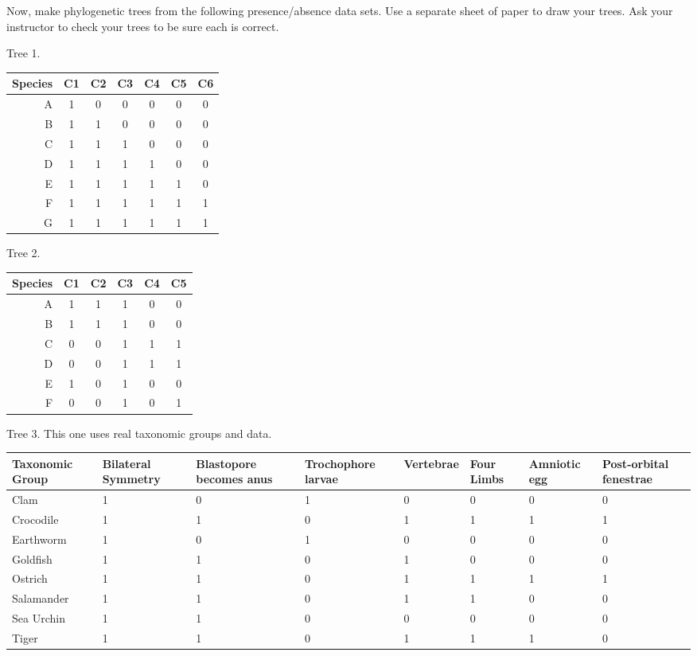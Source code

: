 \documentclass[12pt, addpoints]{exam}
\begin{document}
{\newpage

\thispagestyle{empty}

\begin{landscape}

Now, make phylogenetic trees from the following presence/absence data sets. Use a separate sheet of paper to draw your trees. Ask your instructor to check your trees to be sure each is correct. %

\begin{questions}

\liningnum

\begin{minipage}[t]{0.4\textwidth}
\question
Tree 1.

\begin{longtable}[l]{@{}rcccccc@{}}
\toprule
Species & C1 & C2 & C3 & C4 & C5 & C6\tabularnewline
\midrule
A & 1 & 0 & 0 & 0 & 0 & 0\tabularnewline
B & 1 & 1 & 0 & 0 & 0 & 0\tabularnewline
C & 1 & 1 & 1 & 0 & 0 & 0\tabularnewline
D & 1 & 1 & 1 & 1 & 0 & 0\tabularnewline
E & 1 & 1 & 1 & 1 & 1 & 0\tabularnewline
F & 1 & 1 & 1 & 1 & 1 & 1\tabularnewline
G & 1 & 1 & 1 & 1 & 1 & 1\tabularnewline
\bottomrule
\end{longtable}

\end{minipage}\hspace*{2in}
\begin{minipage}[t]{0.4\textwidth}
\question
Tree 2.
\begin{longtable}[l]{@{}rccccc@{}}
\toprule
Species & C1 & C2 & C3 & C4 & C5 \tabularnewline
\midrule
A & 1 & 1 & 1 & 0 & 0 \tabularnewline
B & 1 & 1 & 1 & 0 & 0 \tabularnewline
C & 0 & 0 & 1 & 1 & 1 \tabularnewline
D & 0 & 0 & 1 & 1 & 1 \tabularnewline
E & 1 & 0 & 1 & 0 & 0 \tabularnewline
F & 0 & 0 & 1 & 0 & 1 \tabularnewline
\bottomrule
\end{longtable}

\end{minipage}

\vspace{2\baselineskip}
\question
Tree 3. This one uses real taxonomic groups and data.

\begin{longtable}[l]{@{}L{0.8in}C{0.75in}C{1in}C{1in}C{0.7in}C{0.7in}C{0.7in}C{1in}@{}}
\toprule
Taxonomic Group & Bilateral Symmetry & Blastopore becomes anus & Trochophore larvae & Vertebrae & Four Limbs & Amniotic egg & Post-orbital fenestrae \tabularnewline
\midrule
Clam &
	1 &
	0 &
	1 & 
	0 & 
	0 &
	0 &
	0	\tabularnewline
Crocodile &
	1 & 
	1 & 
	0 & 
	1 & 
	1 & 
	1 & 
	1	\tabularnewline
Earthworm & 
	1 &
	0 &
	1 & 
	0 & 
	0 &
	0 &
	0	\tabularnewline
Goldfish & 
	1 & 
	1 & 
	0 & 
	1 & 
	0 & 
	0 & 
	0	\tabularnewline
Ostrich & 
	1 & 
	1 & 
	0 & 
	1 & 
	1 & 
	1 & 
	1	\tabularnewline
Salamander & 
	1 & 
	1 & 
	0 & 
	1 & 
	1 & 
	0 & 
	0	\tabularnewline
Sea Urchin &
	1 &
	1 &
	0 & 
	0 & 
	0 & 
	0 & 
	0	\tabularnewline
Tiger & 
	1 & 
	1 & 
	0 & 
	1 & 
	1 & 
	1 & 
	0	\tabularnewline
\bottomrule
\end{longtable}



\end{questions}
\end{landscape}}
\end{document}
